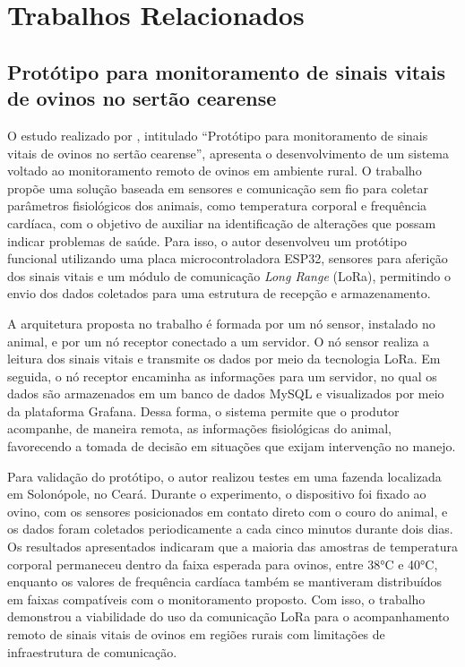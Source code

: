 \chapter{Trabalhos Relacionados}
\label{cap:trabalhos-relacionados}

\section{Protótipo para monitoramento de sinais vitais de ovinos no sertão cearense}
\label{sec:tr-araujo2024}

O estudo realizado por , intitulado ``Protótipo para monitoramento de sinais vitais de ovinos no sertão cearense'', apresenta o desenvolvimento de um sistema voltado ao monitoramento remoto de ovinos em ambiente rural. O trabalho propõe uma solução baseada em sensores e comunicação sem fio para coletar parâmetros fisiológicos dos animais, como temperatura corporal e frequência cardíaca, com o objetivo de auxiliar na identificação de alterações que possam indicar problemas de saúde. Para isso, o autor desenvolveu um protótipo funcional utilizando uma placa microcontroladora ESP32, sensores para aferição dos sinais vitais e um módulo de comunicação \textit{Long Range} (LoRa), permitindo o envio dos dados coletados para uma estrutura de recepção e armazenamento.

A arquitetura proposta no trabalho é formada por um nó sensor, instalado no animal, e por um nó receptor conectado a um servidor. O nó sensor realiza a leitura dos sinais vitais e transmite os dados por meio da tecnologia LoRa. Em seguida, o nó receptor encaminha as informações para um servidor, no qual os dados são armazenados em um banco de dados MySQL e visualizados por meio da plataforma Grafana. Dessa forma, o sistema permite que o produtor acompanhe, de maneira remota, as informações fisiológicas do animal, favorecendo a tomada de decisão em situações que exijam intervenção no manejo.

Para validação do protótipo, o autor realizou testes em uma fazenda localizada em Solonópole, no Ceará. Durante o experimento, o dispositivo foi fixado ao ovino, com os sensores posicionados em contato direto com o couro do animal, e os dados foram coletados periodicamente a cada cinco minutos durante dois dias. Os resultados apresentados indicaram que a maioria das amostras de temperatura corporal permaneceu dentro da faixa esperada para ovinos, entre 38°C e 40°C, enquanto os valores de frequência cardíaca também se mantiveram distribuídos em faixas compatíveis com o monitoramento proposto. Com isso, o trabalho demonstrou a viabilidade do uso da comunicação LoRa para o acompanhamento remoto de sinais vitais de ovinos em regiões rurais com limitações de infraestrutura de comunicação.

